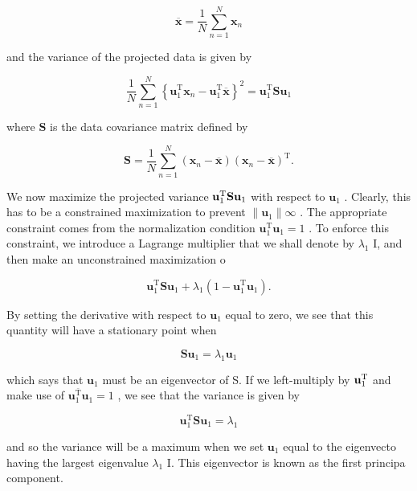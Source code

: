 \documentclass[
  10
]{article}
\begin{document}
\[
\overline {{\mathbf {x}}} = \frac {1}{N} \sum_ {n = 1} ^ {N} \mathbf {x} _ {n}\tag{12.1}
\]

and the variance of the projected data is given by

\[
\frac {1}{N} \sum_ {n = 1} ^ {N} \left\{\mathbf {u} _ {1} ^ {\mathrm{T}} \mathbf {x} _ {n} - \mathbf {u} _ {1} ^ {\mathrm{T}} \overline {{\mathbf {x}}} \right\} ^ {2} = \mathbf {u} _ {1} ^ {\mathrm{T}} \mathbf {S u} _ {1}\tag{12.2}
\]

where \(\mathbf { S }\) is the data covariance matrix defined by

\[
\mathbf {S} = \frac {1}{N} \sum_ {n = 1} ^ {N} (\mathbf {x} _ {n} - \overline {{\mathbf {x}}}) (\mathbf {x} _ {n} - \overline {{\mathbf {x}}}) ^ {\mathrm{T}}.\tag{12.3}
\]

We now maximize the projected variance
\({ \bf u } _ { 1 } ^ { \mathrm { T } } { \bf S } { \bf u } _ { 1 }\)
with respect to \(\mathbf { u } _ { 1 }\) . Clearly, this has to be a
constrained maximization to prevent
\(\| \mathbf { u } _ { 1 } \|  \infty\) . The appropriate constraint
comes from the normalization condition
\(\mathbf { u } _ { 1 } ^ { \mathrm { T } } \mathbf { u } _ { 1 } = 1\)
. To enforce this constraint, we introduce a Lagrange multiplier that we
shall denote by \(\lambda _ { 1 }\) I, and then make an unconstrained
maximization o

\[
\mathbf {u} _ {1} ^ {\mathrm{T}} \mathbf {S u} _ {1} + \lambda_ {1} \left(1 - \mathbf {u} _ {1} ^ {\mathrm{T}} \mathbf {u} _ {1}\right).\tag{12.4}
\]

By setting the derivative with respect to \(\mathbf { u } _ { 1 }\)
equal to zero, we see that this quantity will have a stationary point
when

\[
\mathbf {S u} _ {1} = \lambda_ {1} \mathbf {u} _ {1}\tag{12.5}
\]

which says that \(\mathbf { u } _ { 1 }\) must be an eigenvector of S.
If we left-multiply by \({ \bf u } _ { 1 } ^ { \mathrm { T } }\) and
make use of
\(\mathbf { u } _ { 1 } ^ { \bar { \mathrm { T } } } \mathbf { u } _ { 1 } = 1\)
, we see that the variance is given by

\[
\mathbf {u} _ {1} ^ {\mathrm{T}} \mathbf {S u} _ {1} = \lambda_ {1}\tag{12.6}
\]

and so the variance will be a maximum when we set
\(\mathbf { u } _ { 1 }\) equal to the eigenvecto having the largest
eigenvalue \(\lambda _ { 1 }\) I. This eigenvector is known as the first
principa component.
\end{document}

